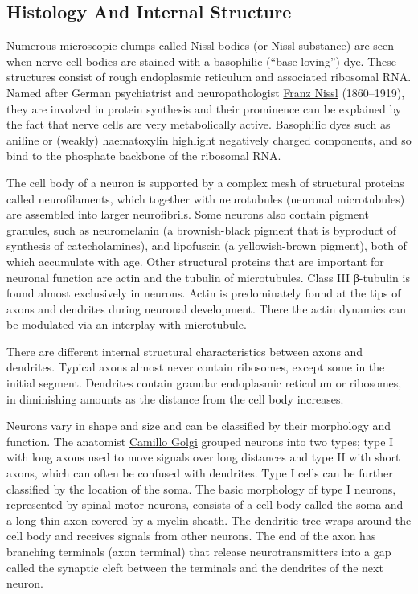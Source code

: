 \hypertarget{histology-and-internal-structure}{%
\subsection{Histology And Internal Structure}\label{histology-and-internal-structure}}

Numerous microscopic clumps called Nissl bodies (or Nissl substance) are seen when nerve cell bodies are stained with a basophilic (``base-loving'') dye. These structures consist of rough endoplasmic reticulum and associated ribosomal RNA. Named after German psychiatrist and neuropathologist \href{https://en.wikipedia.org/wiki/Franz_Nissl}{Franz Nissl} (1860--1919), they are involved in protein synthesis and their prominence can be explained by the fact that nerve cells are very metabolically active. Basophilic dyes such as aniline or (weakly) haematoxylin highlight negatively charged components, and so bind to the phosphate backbone of the ribosomal RNA.

The cell body of a neuron is supported by a complex mesh of structural proteins called neurofilaments, which together with neurotubules (neuronal microtubules) are assembled into larger neurofibrils. Some neurons also contain pigment granules, such as neuromelanin (a brownish-black pigment that is byproduct of synthesis of catecholamines), and lipofuscin (a yellowish-brown pigment), both of which accumulate with age. Other structural proteins that are important for neuronal function are actin and the tubulin of microtubules. Class III β-tubulin is found almost exclusively in neurons. Actin is predominately found at the tips of axons and dendrites during neuronal development. There the actin dynamics can be modulated via an interplay with microtubule.

There are different internal structural characteristics between axons and dendrites. Typical axons almost never contain ribosomes, except some in the initial segment. Dendrites contain granular endoplasmic reticulum or ribosomes, in diminishing amounts as the distance from the cell body increases.

Neurons vary in shape and size and can be classified by their morphology and function. The anatomist \href{https://en.wikipedia.org/wiki/Camillo_Golgi}{Camillo Golgi} grouped neurons into two types; type I with long axons used to move signals over long distances and type II with short axons, which can often be confused with dendrites. Type I cells can be further classified by the location of the soma. The basic morphology of type I neurons, represented by spinal motor neurons, consists of a cell body called the soma and a long thin axon covered by a myelin sheath. The dendritic tree wraps around the cell body and receives signals from other neurons. The end of the axon has branching terminals (axon terminal) that release neurotransmitters into a gap called the synaptic cleft between the terminals and the dendrites of the next neuron.

